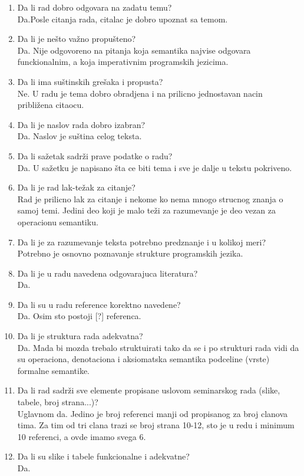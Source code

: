 \documentclass[a4paper]{report}
\begin{document}
\begin{enumerate}
\item Da li rad dobro odgovara na zadatu temu?\\
Da.Posle citanja rada, citalac je dobro upoznat sa temom.
\item Da li je nešto važno propušteno?\\
Da. Nije odgovoreno na pitanja koja semantika najvise odgovara funckionalnim, a koja imperativnim programskih jezicima.
\item Da li ima suštinskih grešaka i propusta?\\
Ne. U radu je tema dobro obradjena i na prilicno jednostavan nacin približena citaocu.
\item Da li je naslov rada dobro izabran?\\
Da. Naslov je suština celog teksta.
\item Da li sažetak sadrži prave podatke o radu?\\
Da. U sažetku je napisano šta ce biti tema i sve je dalje u tekstu pokriveno.
\item Da li je rad lak-težak za citanje?\\
Rad je prilicno lak za citanje i nekome ko nema mnogo strucnog znanja o samoj temi. Jedini deo koji je malo teži za razumevanje je deo vezan za operacionu semantiku.
\item Da li je za razumevanje teksta potrebno predznanje i u kolikoj meri?\\
Potrebno je osnovno poznavanje strukture programskih jezika.
\item Da li je u radu navedena odgovarajuca literatura?\\
Da.
\item Da li su u radu reference korektno navedene?\\
Da. Osim sto postoji [?] referenca. 
\item Da li je struktura rada adekvatna?\\
Da. Mada bi mozda trebalo struktuirati tako da se i po strukturi rada vidi da su operaciona, denotaciona i aksiomatska semantika podceline (vrste) formalne semantike.
\item Da li rad sadrži sve elemente propisane uslovom seminarskog rada (slike, tabele, broj strana...)?\\
Uglavnom da. Jedino je broj referenci manji od propisanog za broj clanova tima. Za tim od tri clana trazi se broj strana 10-12, sto je u redu i minimum 10 referenci, a ovde imamo svega 6.
\item Da li su slike i tabele funkcionalne i adekvatne?\\
Da.
\end{enumerate}
\end{document}
